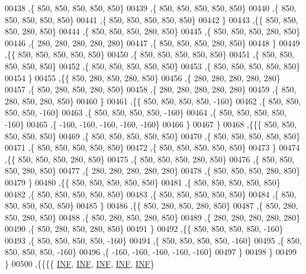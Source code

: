 \begin{DoxyCode}
00438    ,\{   850,   850,   850,   850,   850\}
00439    ,\{   850,   850,   850,   850,   850\}
00440    ,\{   850,   850,   850,   850,   850\}
00441    ,\{   850,   850,   850,   850,   850\}
00442    \}
00443   ,\{\{   850,   850,   850,   280,   850\}
00444    ,\{   850,   850,   850,   280,   850\}
00445    ,\{   850,   850,   850,   280,   850\}
00446    ,\{   280,   280,   280,   280,   280\}
00447    ,\{   850,   850,   850,   280,   850\}
00448    \}
00449   ,\{\{   850,   850,   850,   850,   850\}
00450    ,\{   850,   850,   850,   850,   850\}
00451    ,\{   850,   850,   850,   850,   850\}
00452    ,\{   850,   850,   850,   850,   850\}
00453    ,\{   850,   850,   850,   850,   850\}
00454    \}
00455   ,\{\{   850,   280,   850,   280,   850\}
00456    ,\{   280,   280,   280,   280,   280\}
00457    ,\{   850,   280,   850,   280,   850\}
00458    ,\{   280,   280,   280,   280,   280\}
00459    ,\{   850,   280,   850,   280,   850\}
00460    \}
00461   ,\{\{   850,   850,   850,   850,  -160\}
00462    ,\{   850,   850,   850,   850,  -160\}
00463    ,\{   850,   850,   850,   850,  -160\}
00464    ,\{   850,   850,   850,   850,  -160\}
00465    ,\{  -160,  -160,  -160,  -160,  -160\}
00466    \}
00467   \}
00468  ,\{\{\{   850,   850,   850,   850,   850\}
00469    ,\{   850,   850,   850,   850,   850\}
00470    ,\{   850,   850,   850,   850,   850\}
00471    ,\{   850,   850,   850,   850,   850\}
00472    ,\{   850,   850,   850,   850,   850\}
00473    \}
00474   ,\{\{   850,   850,   850,   280,   850\}
00475    ,\{   850,   850,   850,   280,   850\}
00476    ,\{   850,   850,   850,   280,   850\}
00477    ,\{   280,   280,   280,   280,   280\}
00478    ,\{   850,   850,   850,   280,   850\}
00479    \}
00480   ,\{\{   850,   850,   850,   850,   850\}
00481    ,\{   850,   850,   850,   850,   850\}
00482    ,\{   850,   850,   850,   850,   850\}
00483    ,\{   850,   850,   850,   850,   850\}
00484    ,\{   850,   850,   850,   850,   850\}
00485    \}
00486   ,\{\{   850,   280,   850,   280,   850\}
00487    ,\{   850,   280,   850,   280,   850\}
00488    ,\{   850,   280,   850,   280,   850\}
00489    ,\{   280,   280,   280,   280,   280\}
00490    ,\{   850,   280,   850,   280,   850\}
00491    \}
00492   ,\{\{   850,   850,   850,   850,  -160\}
00493    ,\{   850,   850,   850,   850,  -160\}
00494    ,\{   850,   850,   850,   850,  -160\}
00495    ,\{   850,   850,   850,   850,  -160\}
00496    ,\{  -160,  -160,  -160,  -160,  -160\}
00497    \}
00498   \}
00499  \}
00500 ,\{\{\{\{   \mbox{\hyperlink{1_88_84__epars_8h_a12c2040f25d8e3a7b9e1c2024c618cb6}{INF}},   \mbox{\hyperlink{1_88_84__epars_8h_a12c2040f25d8e3a7b9e1c2024c618cb6}{INF}},   \mbox{\hyperlink{1_88_84__epars_8h_a12c2040f25d8e3a7b9e1c2024c618cb6}{INF}},   \mbox{\hyperlink{1_88_84__epars_8h_a12c2040f25d8e3a7b9e1c2024c618cb6}{INF}},   \mbox{\hyperlink{1_88_84__epars_8h_a12c2040f25d8e3a7b9e1c2024c618cb6}{INF}}\}

\end{DoxyCode}
